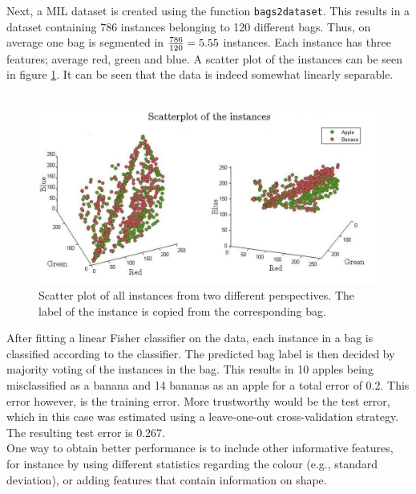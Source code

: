 \documentclass [a4paper] {report}
\begin{document}
	Next, a MIL dataset is created using the function \texttt{bags2dataset}. This results in a dataset containing 786 instances belonging to 120 different bags. Thus, on average one bag is segmented in ${786 \over 120} = 5.55$ instances. Each instance has three features; average red, green and blue.
	A scatter plot of the instances can be seen in figure \ref{scatter}. It can be seen that the data is indeed somewhat linearly separable.\\\\
	
	\begin{figure}[H]
		\begin{center}
			\includegraphics[scale=0.4]{images/scatter.jpg}
			\caption{Scatter plot of all instances from two different perspectives. The label of the instance is copied from the corresponding bag.}
			\label{scatter}
		\end{center}
	\end{figure}
	
	After fitting a linear Fisher classifier on the data, each instance in a bag is classified according to the classifier. The predicted bag label is then decided by majority voting of the instances in the bag. This results in 10 apples being misclassified as a banana and 14 bananas as an apple for a total error of 0.2. This error however, is the training error. More trustworthy would be the test error, which in this case was estimated using a leave-one-out cross-validation strategy. The resulting test error is 0.267. \\
	
	\noindent
	One way to obtain better performance is to include other informative features, for instance by using different statistics regarding the colour (e.g., standard deviation), or adding features that contain information on shape. \\
	
\end{document}
